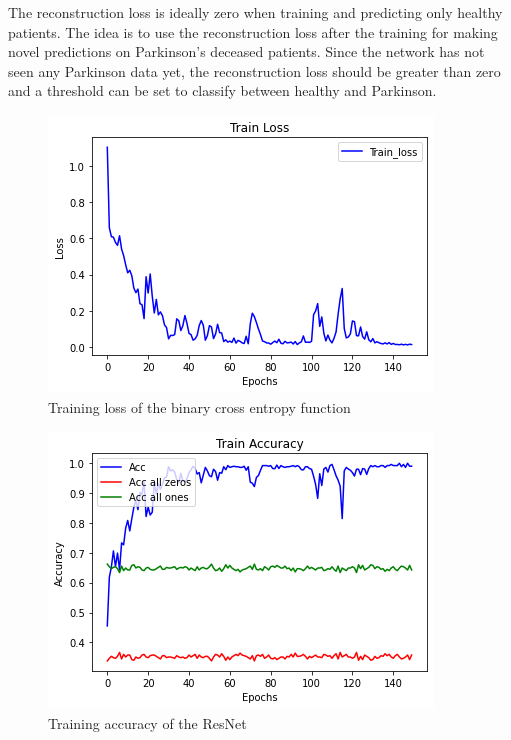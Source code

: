 \documentclass[journal]{IEEEtran}
\begin{document}
The reconstruction loss is ideally zero when training and predicting only healthy patients. The idea is to use the reconstruction loss after the training for making novel predictions on Parkinson's deceased patients. Since the network has not seen any Parkinson data yet, the reconstruction loss should be greater than zero and a threshold can be set to classify between healthy and Parkinson.
\begin{figure}
\includegraphics[width=1\columnwidth]{../imgs/train_loss_resnet.png}
\caption{Training loss of the binary cross entropy function}
\end{figure}
\begin{figure}
\includegraphics[width=1\columnwidth]{../imgs/train_accuracy_resnet.png}
\caption{Training accuracy of the ResNet}
\end{figure}
\end{document}
